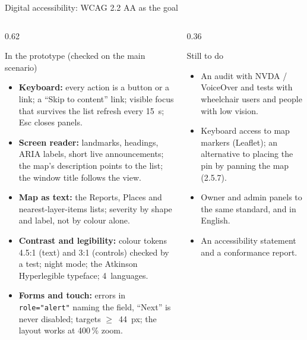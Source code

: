 \begin{frame}{Digital accessibility: WCAG 2.2 AA as the goal}
  \begin{columns}[T,onlytextwidth]
    \begin{column}{0.62\textwidth}
      \begin{block}{In the prototype (checked on the main scenario)}
        \footnotesize
        \begin{itemize}
          \item \textbf{Keyboard:} every action is a button or a link; a “Skip to content” link; visible focus
                that survives the list refresh every 15~s; Esc closes panels.
          \item \textbf{Screen reader:} landmarks, headings, ARIA labels, short live announcements;
                the map's description points to the list; the window title follows the view.
          \item \textbf{Map as text:} the Reports, Places and nearest-layer-items lists;
                severity by shape and label, not by colour alone.
          \item \textbf{Contrast and legibility:} colour tokens 4.5:1 (text) and 3:1 (controls) checked by a test;
                night mode; the Atkinson Hyperlegible typeface; 4~languages.
          \item \textbf{Forms and touch:} errors in \texttt{role="alert"} naming the field, “Next” is never disabled;
                targets $\geq$~44~px; the layout works at 400\,\% zoom.
        \end{itemize}
      \end{block}
    \end{column}
    \begin{column}{0.36\textwidth}
      \begin{alertblock}{Still to do}
        \footnotesize
        \begin{itemize}
          \item An audit with NVDA / VoiceOver and tests with wheelchair users and people with low vision.
          \item Keyboard access to map markers (Leaflet); an alternative to placing the pin by panning the map (2.5.7).
          \item Owner and admin panels to the same standard, and in English.
          \item An accessibility statement and a conformance report.
        \end{itemize}
      \end{alertblock}
      \vspace{0.5mm}
    \end{column}
  \end{columns}


\end{frame}
